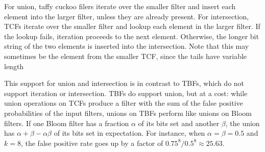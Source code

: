 \documentclass[letterpaper,twocolumn,10pt]{article}
\begin{document}



For union, taffy cuckoo filers iterate over the smaller filter and insert each element into the larger filter, unless they are already present.
For intersection, TCFs iterate over the smaller filter and lookup each element in the larger filter.
If the lookup fails, iteration proceeds to the next element.
Otherwise, the longer bit string of the two elements is inserted into the intersection.
Note that this may sometimes be the element from the smaller TCF, since the tails have variable length


This support for union and intersection is in contrast to TBFs, which do not support iteration or intersection.
TBFs do support union, but at a cost: while union operations on TCFs produce a filter with the sum of the false positive probabilities of the input filters, unions on TBFs perform like unions on Bloom filters.
If one Bloom filter has a fraction $\alpha$ of its bits set and another $\beta$, the union has $\alpha + \beta - \alpha \beta$ of its bits set in expectation.
For instance, when $\alpha = \beta = 0.5$ and $k = 8$, the false positive rate goes up by a factor of $0.75^8/0.5^8 \approx 25.63$. %
\end{document}
